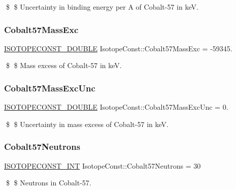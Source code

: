 \$ \$ Uncertainty in binding energy per A of Cobalt-\/57 in keV. \mbox{\label{group___isotope_const-_cobalt-_co57_ga7a65953d01a391d9e60573553a00bcb0}} 
\subsubsection{\texorpdfstring{Cobalt57\+Mass\+Exc}{Cobalt57MassExc}}
{\footnotesize\ttfamily \mbox{\hyperlink{group___isotope_const-_macros_ga8f45a7272ce02c0b4c65c44636ed719a}{I\+S\+O\+T\+O\+P\+E\+C\+O\+N\+S\+T\+\_\+\+D\+O\+U\+B\+LE}} Isotope\+Const\+::\+Cobalt57\+Mass\+Exc = -\/59345.}

\$ \$ Mass excess of Cobalt-\/57 in keV. \mbox{\label{group___isotope_const-_cobalt-_co57_ga2180609495ba6f08e9964a3a653fb457}} 
\subsubsection{\texorpdfstring{Cobalt57\+Mass\+Exc\+Unc}{Cobalt57MassExcUnc}}
{\footnotesize\ttfamily \mbox{\hyperlink{group___isotope_const-_macros_ga8f45a7272ce02c0b4c65c44636ed719a}{I\+S\+O\+T\+O\+P\+E\+C\+O\+N\+S\+T\+\_\+\+D\+O\+U\+B\+LE}} Isotope\+Const\+::\+Cobalt57\+Mass\+Exc\+Unc = 0.}

\$ \$ Uncertainty in mass excess of Cobalt-\/57 in keV. \mbox{\label{group___isotope_const-_cobalt-_co57_gaf9f2bfeb3f2106f8ab6670a634de59d5}} 
\subsubsection{\texorpdfstring{Cobalt57\+Neutrons}{Cobalt57Neutrons}}
{\footnotesize\ttfamily \mbox{\hyperlink{group___isotope_const-_macros_ga5f18360b3e99483a35c32d789e62621c}{I\+S\+O\+T\+O\+P\+E\+C\+O\+N\+S\+T\+\_\+\+I\+NT}} Isotope\+Const\+::\+Cobalt57\+Neutrons = 30}

\$ \$ Neutrons in Cobalt-\/57. \mbox{\label{group___isotope_const-_cobalt-_co57_ga35d91829ff3ccdaa6d97574cc31b4383}} 
